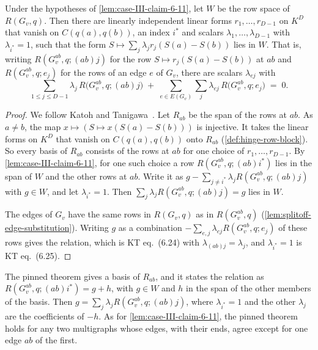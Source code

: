 \begin{lemma}
  \label{lem:case-III-redundant-decomposition}
  \leanok
  Under the hypotheses of \cref{lem:case-III-claim-6-11}, let $W$ be the
  row space of $R(G_v, q)$. Then there are linearly independent linear
  forms $r_1, \dots, r_{D-1}$ on $K^D$ that vanish on $C(q(a), q(b))$, an
  index $i^*$ and scalars $\lambda_1, \dots, \lambda_{D-1}$ with
  $\lambda_{i^*} = 1$, such that the form
  $S \mapsto \sum_j \lambda_j r_j(S(a) - S(b))$ lies in $W$. That is,
  writing $R(G_v^{ab}, q; (ab)j)$ for the row
  $S \mapsto r_j(S(a) - S(b))$ at $ab$ and $R(G_v^{ab}, q; e_j)$ for the
  rows of an edge $e$ of $G_v$, there are scalars $\lambda_{ej}$ with
  \[
    \sum_{1 \le j \le D-1} \lambda_j\, R\bigl(G_v^{ab}, q; (ab)j\bigr)
    \;+\; \sum_{e \in E(G_v)} \sum_{j}
      \lambda_{ej}\, R\bigl(G_v^{ab}, q; e_j\bigr) \;=\; 0 .
  \]
\end{lemma}
\begin{proof}
  \leanok
  We follow Katoh and Tanigawa~\cite[p.~685]{katohTanigawa2011}. Let
  $R_{ab}$ be the span of the rows at $ab$. As $a \neq b$, the map
  $x \mapsto (S \mapsto x(S(a) - S(b)))$ is injective. It takes the
  linear forms on $K^D$ that vanish on $C(q(a), q(b))$ onto $R_{ab}$
  (\cref{def:hinge-row-block}). So every basis of $R_{ab}$ consists of
  the rows at $ab$ for one choice of $r_1, \dots, r_{D-1}$. By
  \cref{lem:case-III-claim-6-11}, for one such choice a row
  $R(G_v^{ab}, q; (ab)i^*)$ lies in the span of $W$ and the other rows at
  $ab$. Write it as $g - \sum_{j \neq i^*} \lambda_j R(G_v^{ab}, q; (ab)j)$
  with $g \in W$, and let $\lambda_{i^*} = 1$. Then
  $\sum_j \lambda_j R(G_v^{ab}, q; (ab)j) = g$ lies in $W$.

  The edges of $G_v$ have the same rows in $R(G_v, q)$ as in
  $R(G_v^{ab}, q)$ (\cref{lem:splitoff-edge-substitution}). Writing $g$
  as a combination $-\sum_{e, j} \lambda_{ej} R(G_v^{ab}, q; e_j)$ of
  these rows gives the relation, which is KT eq.~(6.24) with
  $\lambda_{(ab)j} = \lambda_j$, and $\lambda_{i^*} = 1$ is KT
  eq.~(6.25).
\end{proof}

\begin{fmlnote}
  The pinned theorem gives a basis of $R_{ab}$, and it states the
  relation as $R(G_v^{ab}, q; (ab)i^*) = g + h$, with $g \in W$ and $h$
  in the span of the other members of the basis. Then
  $g = \sum_j \lambda_j R(G_v^{ab}, q; (ab)j)$, where $\lambda_{i^*} = 1$
  and the other $\lambda_j$ are the coefficients of $-h$. As for
  \cref{lem:case-III-claim-6-11}, the pinned theorem holds for any two
  multigraphs whose edges, with their ends, agree except for one edge
  $ab$ of the first.
\end{fmlnote}

